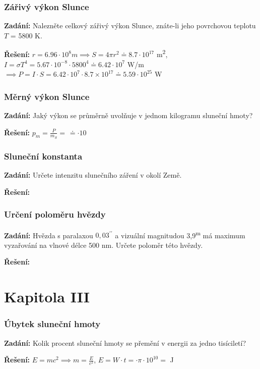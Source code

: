 \documentclass{article}
\begin{document}
\section*{Zářivý výkon Slunce}
\textbf{Zadání:} Nalezněte celkový zářivý výkon Slunce, znáte-li jeho povrchovou teplotu $T$ = 5800 K.

\textbf{Řešení:} $r = 6.96 \cdot 10^8 m \implies S = 4 \pi r^2 \doteq 8.7 \cdot 10^{17}$ m\textsuperscript{2}, $I = \sigma T^4 = 5.67 \cdot 10^{-8} \cdot 5800^4 \doteq 6.42 \cdot 10^7$ W/m $ \implies P = I \cdot S = 6.42 \cdot 10^7 \cdot 8.7 \times 10^{17} \doteq 5.59 \cdot 10^{25}$ W

\section*{Měrný výkon Slunce}
\textbf{Zadání:} Jaký výkon se průměrně uvolňuje v jednom kilogramu sluneční hmoty?

\textbf{Řešení:} $p_m = \frac{P}{m_S} = \frac{}{} \doteq \cdot 10^{}$

\section*{Sluneční konstanta}
\textbf{Zadání:} Určete intenzitu slunečního záření v okolí Země.

\textbf{Řešení:}

\section*{Určení poloměru hvězdy}
\textbf{Zadání:} Hvězda s paralaxou $0,03^{\prime\prime}$ a vizuální magnitudou 3,9\textsuperscript{m} má maximum vyzařování na
vlnové délce 500 nm. Určete poloměr této hvězdy.

\textbf{Řešení:}

\part*{Kapitola \textrm{I\hspace{-.1em}I\hspace{-.1em}I}}

\section*{Úbytek sluneční hmoty}
\textbf{Zadání:} Kolik procent sluneční hmoty se přemění v energii za jedno tisíciletí?

\textbf{Řešení:} $E = mc^2  \implies m = \frac{E}{c^2}$, $E = W \cdot t = \cdot \pi \cdot 10^10 = $ J
\end{document}
